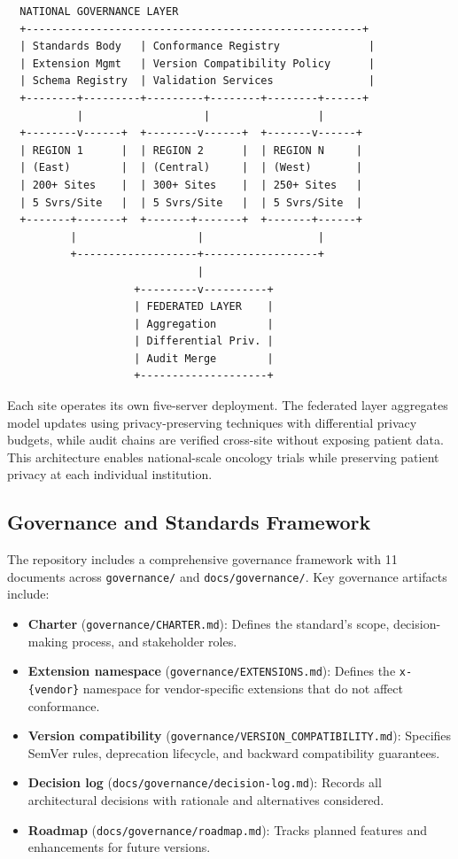 \documentclass{article}
\begin{document}
\begin{verbatim}
  NATIONAL GOVERNANCE LAYER
  +-----------------------------------------------------+
  | Standards Body   | Conformance Registry              |
  | Extension Mgmt   | Version Compatibility Policy      |
  | Schema Registry  | Validation Services               |
  +--------+---------+---------+--------+--------+------+
           |                   |                 |
  +--------v------+  +--------v------+  +-------v------+
  | REGION 1      |  | REGION 2      |  | REGION N     |
  | (East)        |  | (Central)     |  | (West)       |
  | 200+ Sites    |  | 300+ Sites    |  | 250+ Sites   |
  | 5 Svrs/Site   |  | 5 Svrs/Site   |  | 5 Svrs/Site  |
  +-------+-------+  +-------+-------+  +-------+------+
          |                   |                  |
          +-------------------+------------------+
                              |
                    +---------v----------+
                    | FEDERATED LAYER    |
                    | Aggregation        |
                    | Differential Priv. |
                    | Audit Merge        |
                    +--------------------+
\end{verbatim}

Each site operates its own five-server deployment. The federated layer aggregates model updates using privacy-preserving techniques with differential privacy budgets, while audit chains are verified cross-site without exposing patient data. This architecture enables national-scale oncology trials while preserving patient privacy at each individual institution.

\subsection{Governance and Standards Framework}

The repository includes a comprehensive governance framework with 11 documents across \texttt{governance/} and \texttt{docs/governance/}. Key governance artifacts include:

\begin{itemize}[leftmargin=*]
\item \textbf{Charter} (\texttt{governance/CHARTER.md}): Defines the standard's scope, decision-making process, and stakeholder roles.
\item \textbf{Extension namespace} (\texttt{governance/EXTENSIONS.md}): Defines the \texttt{x-\{vendor\}} namespace for vendor-specific extensions that do not affect conformance.
\item \textbf{Version compatibility} (\texttt{governance/VERSION\_COMPATIBILITY.md}): Specifies SemVer rules, deprecation lifecycle, and backward compatibility guarantees.
\item \textbf{Decision log} (\texttt{docs/governance/decision-log.md}): Records all architectural decisions with rationale and alternatives considered.
\item \textbf{Roadmap} (\texttt{docs/governance/roadmap.md}): Tracks planned features and enhancements for future versions.
\end{itemize}
\end{document}
